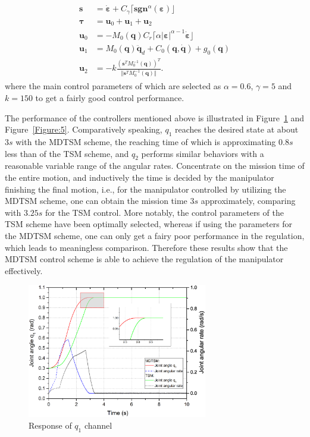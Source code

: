 \documentclass[3p]{elsarticle}
\theoremstyle{plain}
\theoremstyle{remark}
\begin{document}
\begin{align}
\begin{split}
\bm s &= \dot{\bm \varepsilon}+C_\gamma\lceil\bm{sgn}^\alpha(\bm \varepsilon)\rfloor\\
\bm\tau &= \bm u_0+\bm u_1 +\bm u_2\\
\bm u_0 &= -M_0(\bm q)C_r\lceil\alpha\vert\bm\varepsilon\vert^{\alpha-1}\dot{\bm \varepsilon}\rfloor\\
\bm u_1 &= M_0(\bm q)\ddot {\bm q}_d+C_0(\bm q,\dot {\bm q})+g_0(\bm q)\\
\bm u_2 &= -k\frac{(\bm s^TM_0^{-1}(\bm q))^T}{\Vert\bm s^TM_0^{-1}(\bm q)\Vert}.
\end{split}
\end{align}
where the main control parameters of which are selected as $\alpha = 0.6$, $\gamma = 5$ and $k = 150$ to get a fairly good control performance.\par
The performance of the controllers mentioned above is illustrated in Figure~\ref{Figure:4} and Figure~\ref{Figure:5}. Comparatively speaking, $q_1$ reaches the desired state at about $3s$ with the MDTSM scheme, the reaching time of which is approximating $0.8s$ less than of the TSM scheme, and $q_2$ performs similar behaviors with a reasonable variable range of the angular rates. Concentrate on the mission time of the entire motion, and inductively the time is decided by the manipulator finishing the final motion, i.e., for the manipulator controlled by utilizing the MDTSM scheme, one can obtain the mission time $3s$ approximately, comparing with $3.25s$ for the TSM control. More notably, the control parameters of the TSM scheme have been optimally selected, whereas if using the parameters for the MDTSM scheme, one can only get a fairy poor performance in the regulation, which leads to meaningless comparison. Therefore these results show that the MDTSM control scheme is able to achieve the regulation of the manipulator effectively.
\begin{figure}
\centering
\includegraphics[width=0.7\textwidth]{paper3_fig4.eps}
\caption{Response of $q_1$ channel}
\label{Figure:4}
\end{figure}
\end{document}
